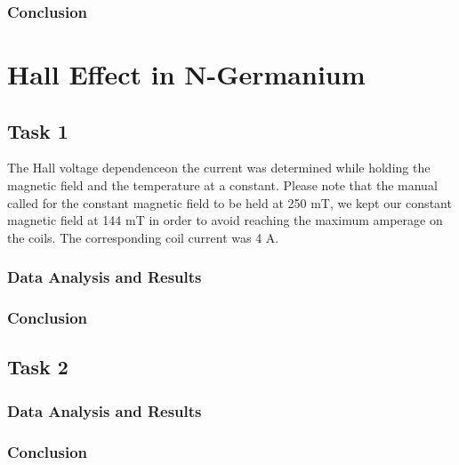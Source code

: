 \documentclass[a4paper]{article}
\begin{document}
\subsubsection{Conclusion}


\section{Hall Effect in N-Germanium}

\subsection{Task 1}

\qq The Hall voltage dependenceon the current was determined while
holding the magnetic field and the temperature at a constant. Please
note that the manual called for the constant magnetic field to be held
at 250 mT, we kept our constant magnetic field at 144 mT in order to
avoid reaching the maximum amperage on the coils. The corresponding
coil current was 4 A.

\subsubsection{Data Analysis and Results}

\subsubsection{Conclusion}

\subsection{Task 2}

\subsubsection{Data Analysis and Results}

\subsubsection{Conclusion}
\end{document}
